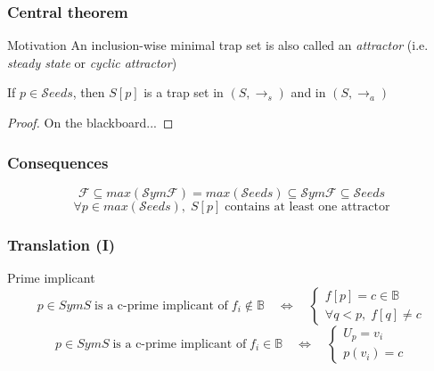 \documentclass{beamer}
\newcommand{\F}[0]{\mathcal{F}}
\newcommand{\SymF}[0]{\mathcal{S}ym\mathcal{F}}
\newcommand{\Seeds}[0]{\mathcal{S}eeds}
\begin{document}
\begin{frame}
  \frametitle{Central theorem}
  \begin{block}{Motivation}
    An inclusion-wise minimal trap set is also called an \emph{attractor} (i.e. \emph{steady state} or \emph{cyclic attractor})
  \end{block}
  \pause
  \begin{theorem}
    If $ p \in \Seeds $, then $ S[p] $ is a trap set in $ (S, \rightarrow_s) $  and in $ (S, \rightarrow_a) $
  \end{theorem}
  \pause
  \begin{proof}
    On the blackboard...
  \end{proof}
\end{frame}

\begin{frame}
  \frametitle{Consequences}
  \begin{center}
    \begin{equation*}
      \F \subseteq max(\SymF) = max(\Seeds) \subseteq \SymF \subseteq \Seeds
    \end{equation*}
    \bigskip
    \begin{equation*}
      \forall p \in max(\Seeds), \; S[p] \; \text{contains at least one attractor}
    \end{equation*}
  \end{center}
\end{frame}

\begin{frame}
  \frametitle{Translation (I)}
  \begin{block}{Prime implicant}
    \begin{equation*}
      p \in SymS \; \text{is a c-prime implicant of} \; f_i \notin \mathbb{B} \quad \Leftrightarrow \quad \begin{cases} f[p] = c \in \mathbb{B} \\ \forall q < p, \; f[q] \neq c \end{cases}
    \end{equation*}
    \begin{equation*}
      p \in SymS \; \text{is a c-prime implicant of} \; f_i \in \mathbb{B} \quad \Leftrightarrow \quad \begin{cases} U_p = v_i \\ p(v_i) = c \end{cases}
    \end{equation*}
  \end{block}
\end{frame}
\end{document}
